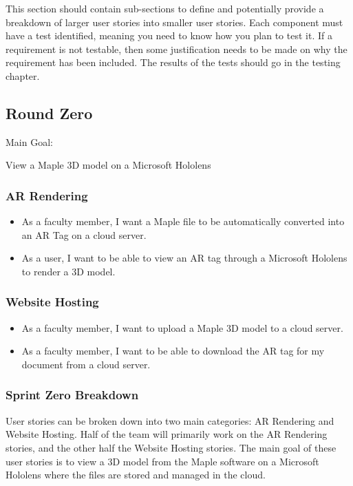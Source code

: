 This section should contain sub-sections to define and potentially provide a breakdown 
of larger user stories into smaller user stories.   Each component must have a test identified, 
meaning you need to know how you plan to test it.  If a requirement is not testable, then 
some justification needs to be made on why the requirement has been included.  
 The results of the tests should go in the testing chapter. 



\subsection{Round Zero}

Main Goal:

View a Maple 3D model on a Microsoft Hololens

\subsubsection{AR Rendering}

\begin{itemize}
	\item As a faculty member, I want a Maple file to be automatically converted into an AR Tag on a cloud server.
	\item As a user, I want to be able to view an AR tag through a Microsoft Hololens to render a 3D model.
\end{itemize}

\subsubsection{Website Hosting}

\begin{itemize}
	\item As a faculty member, I want to upload a Maple 3D model to a cloud server.
	\item As a faculty member, I want to be able to download the AR tag for my document from a cloud server.
\end{itemize}

\subsubsection{Sprint Zero Breakdown}
User stories can be broken down into two main categories: AR Rendering and Website Hosting.  Half of the team will primarily work on 
the AR Rendering stories, and the other half the Website Hosting stories.  The main goal of these user stories is to view a
3D model from the Maple software on a Microsoft Hololens where the files are stored and managed in the cloud.

